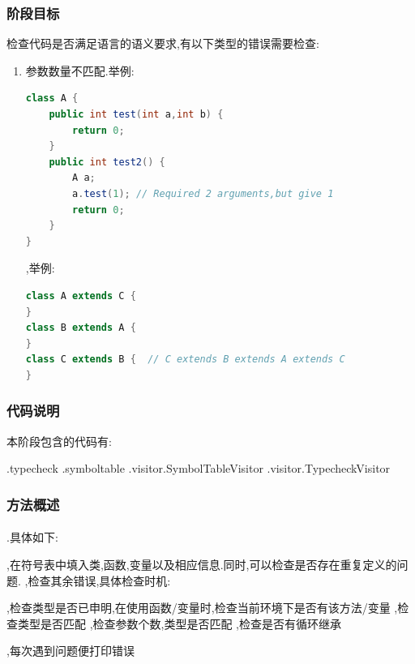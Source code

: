 \documentclass[11pt, oneside]{article}   	%
\begin{document}
\begin{spacing}{1.55}
		\subsubsection{阶段目标}
		检查代码是否满足语言的语义要求,有以下类型的错误需要检查:
		\begin{enumerate}
			,函数,变量.举例:
			\begin{lstlisting}[language=Java]
class A {
	B a; // Undeclared Class B
}
			\end{lstlisting}
			,函数,变量.举例:
			\begin{lstlisting}[language=Java]
class A {
	A a;
	int a; // Declared Variable a
}
			\end{lstlisting}
			,举例:
			\begin{lstlisting}[language=Java]
class A {
	public int test() {
		A a;
		return a; // Required int,but return A
	}			
}
			\end{lstlisting}
			\item 参数数量不匹配.举例:
			\begin{lstlisting}[language=Java]
class A {
	public int test(int a,int b) {
		return 0;
	}
	public int test2() {
		A a;
		a.test(1); // Required 2 arguments,but give 1
		return 0;
	}
}
			\end{lstlisting}
			,举例:
			\begin{lstlisting}[language=Java]
class A extends C {
}
class B extends A {
}
class C extends B {  // C extends B extends A extends C
}
			\end{lstlisting}
		\end{enumerate}
    \subsubsection{代码说明}
	本阶段包含的代码有:
	\begin{enumerate}
	.typecheck
	.symboltable
	.visitor.SymbolTableVisitor
	.visitor.TypecheckVisitor
	\end{enumerate}
	\subsubsection{方法概述}
	\paragraph{}
	\indent{}.具体如下:
	\begin{enumerate}
	,在符号表中填入类,函数,变量以及相应信息.同时,可以检查是否存在重复定义的问题.
	,检查其余错误,具体检查时机:
	\begin{enumerate}
	,检查类型是否已申明,在使用函数/变量时,检查当前环境下是否有该方法/变量
	,检查类型是否匹配
	,检查参数个数,类型是否匹配
	,检查是否有循环继承
	\end{enumerate}
	,每次遇到问题便打印错误
	\end{enumerate}

\end{spacing}
\end{document}
